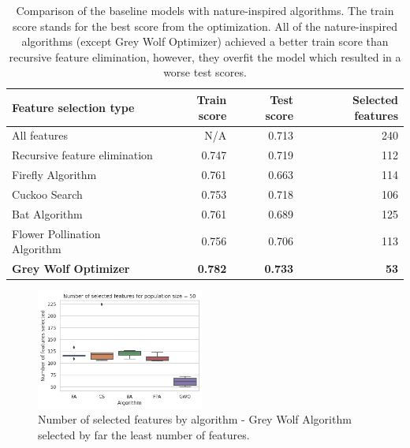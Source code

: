 \documentclass[runningheads]{llncs}
\begin{document}
\begin{table}[]
	\begin{center}
		\begin{tabular}{|lrrr|}
			\hline
			\textbf{Feature selection type} & \textbf{Train score} & \textbf{Test score} & \textbf{Selected features} \\ \hline
			All features                    & N/A                  & 0.713               & 240                                  \\
			Recursive feature elimination   & 0.747                & 0.719               & 112                                  \\
			Firefly Algorithm               & 0.761                & 0.663               & 114                                  \\
			Cuckoo Search                   & 0.753                & 0.718               & 106                                  \\
			Bat Algorithm                   & 0.761                & 0.689               & 125                                  \\
			Flower Pollination Algorithm    & 0.756                & 0.706               & 113                                  \\
			\textbf{Grey Wolf Optimizer}             & \textbf{0.782}                & \textbf{0.733}               & \textbf{53}                                   \\ \hline
		\end{tabular}
	\end{center}
	\begin{center}
		\caption{Comparison of the baseline models with nature-inspired algorithms. The train score stands for the best score from the optimization. All of the nature-inspired algorithms (except Grey Wolf Optimizer) achieved a better train score than recursive feature elimination, however, they overfit the model which resulted in a worse test scores.} \label{tab:nia_baseline_comparison}
	\end{center}
\end{table}

\begin{figure}[ht]
	\begin{center}
	    \includegraphics[width=5.5cm]{figures/nia_selected_features_by_algorithm.png}
    \end{center}
	\caption{Number of selected features by algorithm - Grey Wolf Algorithm selected by far the least number of features.}
	\label{fig:nia_selected_features_by_algorithm}
\end{figure}
\end{document}
